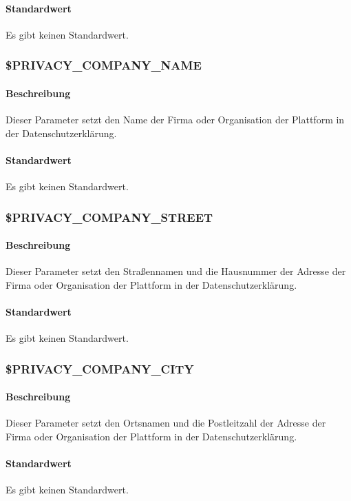 \paragraph{Standardwert}Es gibt keinen Standardwert.

\subsubsection{\$PRIVACY\_COMPANY\_NAME}\label{config:privacy-comp-name}
\paragraph{Beschreibung}Dieser Parameter setzt den Name der Firma oder Organisation der Plattform in der Datenschutzerklärung.
\paragraph{Standardwert}Es gibt keinen Standardwert.

\subsubsection{\$PRIVACY\_COMPANY\_STREET}\label{config:privacy-comp-street}
\paragraph{Beschreibung}Dieser Parameter setzt den Straßennamen und die Hausnummer der Adresse der Firma oder Organisation der Plattform in der Datenschutzerklärung.
\paragraph{Standardwert}Es gibt keinen Standardwert.

\subsubsection{\$PRIVACY\_COMPANY\_CITY}\label{config:privacy-comp-city}
\paragraph{Beschreibung}Dieser Parameter setzt den Ortsnamen und die Postleitzahl der Adresse der Firma oder Organisation der Plattform in der Datenschutzerklärung.
\paragraph{Standardwert}Es gibt keinen Standardwert.

